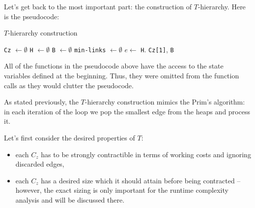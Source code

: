 Let's get back to the most important part: the construction of $T$-hierarchy. Here is the pseudocode:
\begin{algorithm}[H]
\caption{$T$-hierarchy construction}
\begin{algorithmic}[1]
    \State \texttt{Cz} $\gets \emptyset$
    \State \texttt{H} $\gets \emptyset$ 
    \State \texttt{B} $\gets \emptyset$ 
    \State \texttt{min-links} $\gets \emptyset$
    \State {}
            \State {}
        \Else
            \State $e \gets$ \texttt{H}.
                \State {}
            \EndIf
            \State {}
        \EndIf
    \EndWhile
        \State {}
    \EndWhile
    \State \Return \texttt{Cz[1]}, \texttt{B}
\EndFunction
\end{algorithmic}
\label{tconstr}
\end{algorithm}

\begin{remark}
    All of the functions in the pseudocode above have the access to the state variables defined at the beginning. Thus, they were omitted from the function calls as they would clutter the pseudocode.
\end{remark}

As stated previously, the $T$-hierarchy construction mimics the Prim's algorithm: in each iteration of the loop we pop the smallest edge from the heaps and process it. 

Let's first consider the desired properties of $T$:
\begin{itemize}
    \item each $C_z$ has to be strongly contractible in terms of working costs and ignoring discarded edges,
    \item each $C_z$ has a desired size which it should attain before being contracted -- however, the exact sizing is only important for the runtime complexity analysis and will be discussed there.
\end{itemize}

